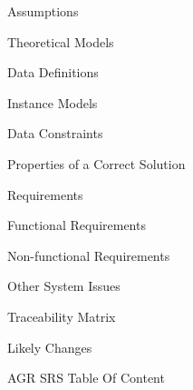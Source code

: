\begin{figure}[hp]
{{\begin{myEnumerate}
\begin{myEnumerate}
	\begin{myEnumerate}
	\item Assumptions
	\item Theoretical Models
	\item Data Definitions
	\item Instance Models
	\item Data Constraints
	\item Properties of a Correct Solution
	\end{myEnumerate}
	\end{myEnumerate}
	\item Requirements
	\begin{myEnumerate}
	\item Functional Requirements
	\item Non-functional Requirements
	\end{myEnumerate}
	\item Other System Issues
	\item Traceability Matrix
	\item Likely Changes
    \end{myEnumerate}
}}
    \caption[AGR SRS Table Of Content]{AGR SRS Table Of Content}
    \label{fig_agr_srs_toc}
\end{figure}

